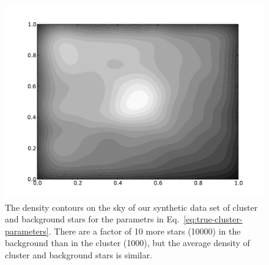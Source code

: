 \documentclass[aps,prd]{revtex4-1}
\begin{document}
\begin{figure}
  \includegraphics[width=\columnwidth]{sky-density}
  \caption{\label{fig:sky-density} The density contours on the sky of
    our synthetic data set of cluster and background stars for the
    parametrs in Eq.~\eqref{eq:true-cluster-parameters}.  There are a
    factor of 10 more stars (10000) in the background than in the
    cluster (1000), but the average density of cluster and background
    stars is similar.}
\end{figure}
\end{document}
